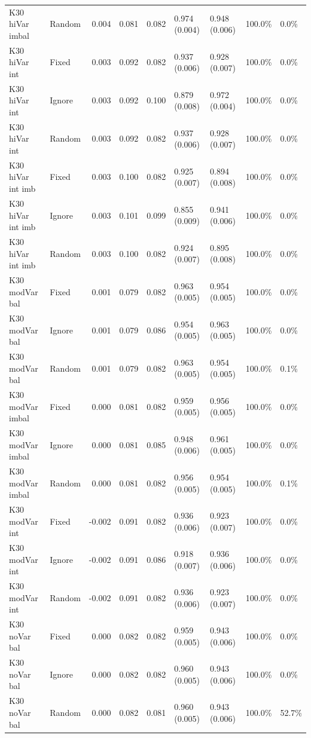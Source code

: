 \documentclass[
  11pt,
]{article}
\begin{document}
\begin{table}[!h]
{\begin{tabular}[t]{llrrrllll}
K30 hiVar imbal & Random & 0.004 & 0.081 & 0.082 & 0.974 (0.004) & 0.948 (0.006) & 100.0\% & 0.0\%\\
K30 hiVar int & Fixed & 0.003 & 0.092 & 0.082 & 0.937 (0.006) & 0.928 (0.007) & 100.0\% & 0.0\%\\
K30 hiVar int & Ignore & 0.003 & 0.092 & 0.100 & 0.879 (0.008) & 0.972 (0.004) & 100.0\% & 0.0\%\\
K30 hiVar int & Random & 0.003 & 0.092 & 0.082 & 0.937 (0.006) & 0.928 (0.007) & 100.0\% & 0.0\%\\
K30 hiVar int imb & Fixed & 0.003 & 0.100 & 0.082 & 0.925 (0.007) & 0.894 (0.008) & 100.0\% & 0.0\%\\
K30 hiVar int imb & Ignore & 0.003 & 0.101 & 0.099 & 0.855 (0.009) & 0.941 (0.006) & 100.0\% & 0.0\%\\
K30 hiVar int imb & Random & 0.003 & 0.100 & 0.082 & 0.924 (0.007) & 0.895 (0.008) & 100.0\% & 0.0\%\\
K30 modVar bal & Fixed & 0.001 & 0.079 & 0.082 & 0.963 (0.005) & 0.954 (0.005) & 100.0\% & 0.0\%\\
K30 modVar bal & Ignore & 0.001 & 0.079 & 0.086 & 0.954 (0.005) & 0.963 (0.005) & 100.0\% & 0.0\%\\
K30 modVar bal & Random & 0.001 & 0.079 & 0.082 & 0.963 (0.005) & 0.954 (0.005) & 100.0\% & 0.1\%\\
K30 modVar imbal & Fixed & 0.000 & 0.081 & 0.082 & 0.959 (0.005) & 0.956 (0.005) & 100.0\% & 0.0\%\\
K30 modVar imbal & Ignore & 0.000 & 0.081 & 0.085 & 0.948 (0.006) & 0.961 (0.005) & 100.0\% & 0.0\%\\
K30 modVar imbal & Random & 0.000 & 0.081 & 0.082 & 0.956 (0.005) & 0.954 (0.005) & 100.0\% & 0.1\%\\
K30 modVar int & Fixed & -0.002 & 0.091 & 0.082 & 0.936 (0.006) & 0.923 (0.007) & 100.0\% & 0.0\%\\
K30 modVar int & Ignore & -0.002 & 0.091 & 0.086 & 0.918 (0.007) & 0.936 (0.006) & 100.0\% & 0.0\%\\
K30 modVar int & Random & -0.002 & 0.091 & 0.082 & 0.936 (0.006) & 0.923 (0.007) & 100.0\% & 0.0\%\\
K30 noVar bal & Fixed & 0.000 & 0.082 & 0.082 & 0.959 (0.005) & 0.943 (0.006) & 100.0\% & 0.0\%\\
K30 noVar bal & Ignore & 0.000 & 0.082 & 0.082 & 0.960 (0.005) & 0.943 (0.006) & 100.0\% & 0.0\%\\
K30 noVar bal & Random & 0.000 & 0.082 & 0.081 & 0.960 (0.005) & 0.943 (0.006) & 100.0\% & 52.7\%\\
\bottomrule
\end{tabular}}
\end{table}
\end{document}
